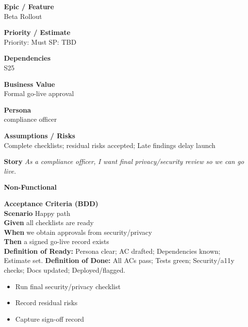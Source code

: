 \documentclass[11pt,a4paper]{article}
\newenvironment{StoryCard}[2][]{
  \begin{tcolorbox}[enhanced, breakable, sharp corners=all, colback=cardback, colframe=cardframe,
    title={#2}, fonttitle=\bfseries\large, boxrule=0.6pt, borderline west={2pt}{0pt}{accent}, #1]
}{
  \end{tcolorbox}
}
\newcommand{\badge}[1]{\pill{\footnotesize #1}}
\newcommand{\cb}{\(\square\)}
\newenvironment{TasksBox}[1][Tasks]{%
  \begin{tcolorbox}[enhanced,breakable,
    colback=cardback, colframe=cardframe, title={#1},
    borderline west={1.8pt}{0pt}{MidnightBlue},
    arc=2pt, boxrule=0.4pt,
    left=10pt,right=10pt,top=6pt,bottom=6pt,
    before skip=6pt, after skip=10pt
  ]
  \small
  \begin{itemize}[label=\cb, leftmargin=*, labelsep=0.6em, itemsep=4pt, topsep=2pt, parsep=0pt]
}{%
  \end{itemize}
  \end{tcolorbox}
}
\begin{document}
\begin{StoryCard}{S26 — Safety review \& sign-off}
\noindent\begin{minipage}[t]{0.49\textwidth}
\textbf{Epic / Feature}\\
Beta Rollout

\medskip
\textbf{Priority / Estimate}\\
Priority: Must \quad SP: TBD

\medskip
\textbf{Dependencies}\\
S25
\end{minipage}\hfill
\begin{minipage}[t]{0.49\textwidth}
\textbf{Business Value}\\
Formal go-live approval

\medskip
\textbf{Persona}\\
compliance officer

\medskip
\textbf{Assumptions / Risks}\\
Complete checklists; residual risks accepted; Late findings delay launch
\end{minipage}

\medskip
\textbf{Story} \emph{As a compliance officer, I want final privacy/security review so we can go live.}

\medskip
\textbf{Non-Functional}
\badge{Security}\ \badge{Privacy}

\medskip
\textbf{Acceptance Criteria (BDD)}\\
\textbf{Scenario} Happy path\\
\textbf{Given} all checklists are ready\\
\textbf{When} we obtain approvals from security/privacy\\
\textbf{Then} a signed go-live record exists\\

\medskip
\footnotesize \textbf{Definition of Ready:} Persona clear; AC drafted; Dependencies known; Estimate set.\quad
\textbf{Definition of Done:} All ACs pass; Tests green; Security/a11y checks; Docs updated; Deployed/flagged.
\end{StoryCard}

\begin{TasksBox}[Tasks]
  \item Run final security/privacy checklist
  \item Record residual risks
  \item Capture sign-off record
\end{TasksBox}
\clearpage
\end{document}

